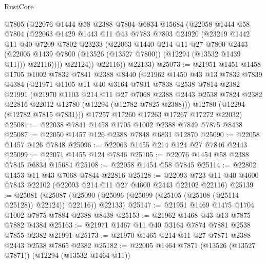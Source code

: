 \begin{lexlean}{RustCore}
\begin{coremodule}
            @7805
            (@22076
              @1444
              @58
              @2388
              @7804
              @6834
              @15684
              (@22058
                @1444
                @58
                @7804
                (@22063
                  @1429
                  @1443
                  @11
                  @43
                  @7783
                  @7803
                  @24920
                  (@23219
                    @1442
                    @11
                    @40
                    @7209
                    @7802
                    @23233
                    (@22063
                      @1440
                      @214
                      @11
                      @27
                      @7800
                      @2443
                      (@22005 @1439 @7800 (@13526 (@13527 @7800)) (@12294 (@13532 @1439 @11)))
                      @22116))))
              @22124))
          @22116))
      @22133)
@25073 := @21951
    @1451
    @1458
    @1705
    @1002
    @7832
    @7841
    @2388
    @8440
    (@21962
      @1450
      @43
      @13
      @7832
      @7839
      @4384
      (@21971
        @1105
        @11
        @40
        @3164
        @7831
        @7838
        @2538
        @7814
        @2382
        @21991
        (@21970
          @1103
          @214
          @11
          @27
          @7068
          @2388
          @2443
          @2538
          @7824
          @2382
          @22816
          @22012
          @12780
          (@12294 (@12782 @7825 @2388)))
        @12780
        (@12294 (@12782 @7815 @7831)))
      @17257
      @17260
      @17263
      @17267
      @17272
      @22032)
@25081 := @22038 @7841 @1458 @1705 @1002 @2388 @7849 @7875 @8438
@25087 := @22050 @1457 @126 @2388 @7848 @6831 @12870
@25090 := @22058 @1457 @126 @7848
@25096 := @22063 @1455 @214 @124 @27 @7846 @2443
@25099 := @22071 @1455 @124 @7846
@25105 := @22076 @1454 @58 @2388 @7845 @6834 @15684
@25108 := @22058 @1454 @58 @7845
@25114 := @22802 @1453 @11 @43 @7068 @7844 @22816
@25128 := @22093 @723 @11 @40 @4600 @7843 @22102 (@22093 @214 @11 @27 @4600 @2443 @22102 @22116)
@25139 := @25081
    (@25087 (@25090 (@25096 (@25099 (@25105 (@25108 (@25114 @25128)) @22124)) @22116)) @22133)
@25147 := @21951 @1469 @1475 @1704 @1002 @7875 @7884 @2388 @8438
@25153 := @21962 @1468 @43 @13 @7875 @7882 @4384
@25163 := @21971 @1467 @11 @40 @3164 @7874 @7881 @2538 @7855 @2382 @21991
@25173 := @21970 @1465 @214 @11 @27 @7871 @2388 @2443 @2538 @7865 @2382
@25182 := @22005 @1464 @7871 (@13526 (@13527 @7871)) (@12294 (@13532 @1464 @11))

\end{coremodule}
\end{lexlean}
